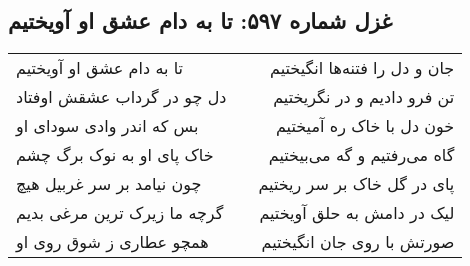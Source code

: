 \begin{center}
\section*{غزل شماره ۵۹۷: تا به دام عشق او آویختیم}
\label{sec:597}
\begin{longtable}{l p{0.5cm} r}
تا به دام عشق او آویختیم
&&
جان و دل را فتنه‌ها انگیختیم
\\
دل چو در گرداب عشقش اوفتاد
&&
تن فرو دادیم و در نگریختیم
\\
بس که اندر وادی سودای او
&&
خون دل با خاک ره آمیختیم
\\
خاک پای او به نوک برگ چشم
&&
گاه می‌رفتیم و گه می‌بیختیم
\\
چون نیامد بر سر غربیل هیچ
&&
پای در گل خاک بر سر ریختیم
\\
گرچه ما زیرک ترین مرغی بدیم
&&
لیک در دامش به حلق آویختیم
\\
همچو عطاری ز شوق روی او
&&
صورتش با روی جان انگیختیم
\\
\end{longtable}
\end{center}
